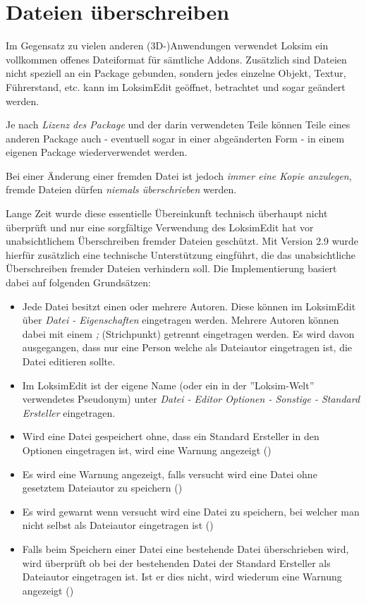 \section{Dateien überschreiben}
\label{sec:editor-allg-dateienueberschreiben}

Im Gegensatz zu vielen anderen (3D-)Anwendungen verwendet Loksim ein vollkommen offenes Dateiformat für sämtliche Addons. Zusätzlich sind Dateien nicht speziell an ein Package gebunden, sondern jedes einzelne Objekt, Textur, Führerstand, etc. kann im LoksimEdit geöffnet, betrachtet und sogar geändert werden.

Je nach \emph{Lizenz des Package} und der darin verwendeten Teile können Teile eines anderen Package auch - eventuell sogar in einer abgeänderten Form - in einem eigenen Package wiederverwendet werden. 

Bei einer Änderung einer fremden Datei ist jedoch \emph{immer eine Kopie anzulegen}, fremde Dateien dürfen \emph{niemals überschrieben} werden.

Lange Zeit wurde diese essentielle Übereinkunft technisch überhaupt nicht überprüft und nur eine sorgfältige Verwendung des LoksimEdit hat vor unabsichtlichem Überschreiben fremder Dateien geschützt. Mit Version 2.9 wurde hierfür zusätzlich eine technische Unterstützung eingführt, die das unabsichtliche Überschreiben fremder Dateien verhindern soll. Die Implementierung basiert dabei auf folgenden Grundsätzen:
\begin{itemize}
\item Jede Datei besitzt einen oder mehrere Autoren. Diese können im LoksimEdit über \emph{Datei - Eigenschaften} eingetragen werden. Mehrere Autoren können dabei mit einem \emph{;} (Strichpunkt) getrennt eingetragen werden. Es wird davon ausgegangen, dass nur eine Person welche als Dateiautor eingetragen ist, die Datei editieren sollte.
\item Im LoksimEdit ist der eigene Name (oder ein in der ''Loksim-Welt'' verwendetes Pseudonym) unter \emph{Datei - Editor Optionen - Sonstige - Standard Ersteller} eingetragen.
\item Wird eine Datei gespeichert ohne, dass ein Standard Ersteller in den Optionen eingetragen ist, wird eine Warnung angezeigt ()
\item Es wird eine Warnung angezeigt, falls versucht wird eine Datei ohne gesetztem Dateiautor zu speichern ()
\item Es wird gewarnt wenn versucht wird eine Datei zu speichern, bei welcher man nicht selbst als Dateiautor eingetragen ist ()
\item Falls beim Speichern einer Datei eine bestehende Datei überschrieben wird, wird überprüft ob bei der bestehenden Datei der Standard Ersteller als Dateiautor eingetragen ist. Ist er dies nicht, wird wiederum eine Warnung angezeigt ()
\end{itemize}


